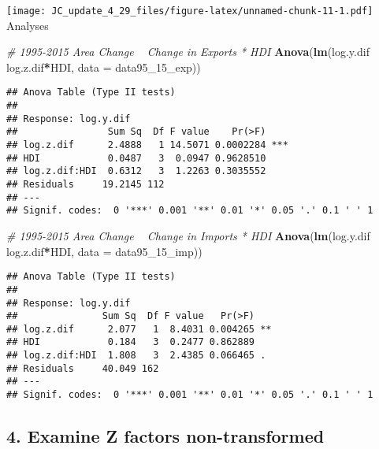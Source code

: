 \documentclass[
]{article}
\newenvironment{Shaded}{\begin{snugshade}}{\end{snugshade}}
\newcommand{\CommentTok}[1]{\textcolor[rgb]{0.56,0.35,0.01}{\textit{#1}}}
\newcommand{\DataTypeTok}[1]{\textcolor[rgb]{0.13,0.29,0.53}{#1}}
\newcommand{\DecValTok}[1]{\textcolor[rgb]{0.00,0.00,0.81}{#1}}
\newcommand{\KeywordTok}[1]{\textcolor[rgb]{0.13,0.29,0.53}{\textbf{#1}}}
\newcommand{\NormalTok}[1]{#1}
\newcommand{\OperatorTok}[1]{\textcolor[rgb]{0.81,0.36,0.00}{\textbf{#1}}}
\newcommand{\StringTok}[1]{\textcolor[rgb]{0.31,0.60,0.02}{#1}}
\begin{document}
\texttt{[image: JC\_update\_4\_29\_files/figure-latex/unnamed-chunk-11-1.pdf]}
Analyses

\begin{Shaded}
\begin{Highlighting}[]
\CommentTok{# 1995-2015 Area Change ~ Change in Exports * HDI}
\KeywordTok{Anova}\NormalTok{(}\KeywordTok{lm}\NormalTok{(log.y.dif }\OperatorTok{~}\StringTok{ }\NormalTok{log.z.dif}\OperatorTok{*}\NormalTok{HDI, }\DataTypeTok{data =}\NormalTok{ data95_}\DecValTok{15}\NormalTok{_exp))}
\end{Highlighting}
\end{Shaded}

\begin{verbatim}
## Anova Table (Type II tests)
## 
## Response: log.y.dif
##                Sum Sq  Df F value    Pr(>F)    
## log.z.dif      2.4888   1 14.5071 0.0002284 ***
## HDI            0.0487   3  0.0947 0.9628510    
## log.z.dif:HDI  0.6312   3  1.2263 0.3035552    
## Residuals     19.2145 112                      
## ---
## Signif. codes:  0 '***' 0.001 '**' 0.01 '*' 0.05 '.' 0.1 ' ' 1
\end{verbatim}

\begin{Shaded}
\begin{Highlighting}[]
\CommentTok{# 1995-2015 Area Change ~ Change in Imports * HDI}
\KeywordTok{Anova}\NormalTok{(}\KeywordTok{lm}\NormalTok{(log.y.dif }\OperatorTok{~}\StringTok{ }\NormalTok{log.z.dif}\OperatorTok{*}\NormalTok{HDI, }\DataTypeTok{data =}\NormalTok{ data95_}\DecValTok{15}\NormalTok{_imp))}
\end{Highlighting}
\end{Shaded}

\begin{verbatim}
## Anova Table (Type II tests)
## 
## Response: log.y.dif
##               Sum Sq  Df F value   Pr(>F)   
## log.z.dif      2.077   1  8.4031 0.004265 **
## HDI            0.184   3  0.2477 0.862889   
## log.z.dif:HDI  1.808   3  2.4385 0.066465 . 
## Residuals     40.049 162                    
## ---
## Signif. codes:  0 '***' 0.001 '**' 0.01 '*' 0.05 '.' 0.1 ' ' 1
\end{verbatim}

\hypertarget{examine-z-factors-non-transformed}{%
\subsection{4. Examine Z factors
non-transformed}\label{examine-z-factors-non-transformed}}
\end{document}
